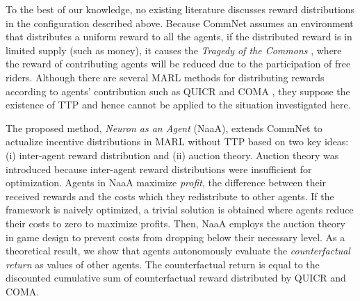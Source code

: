 To the best of our knowledge, no existing literature discusses reward distributions in the configuration described above.
Because CommNet assumes an environment that distributes a uniform reward to all the agents, 
if the distributed reward is in limited supply (such as money), it causes the {\em Tragedy of the Commons} \citep{lloyd1833two}, where the reward of contributing agents will be reduced due to the participation of free riders.
Although there are several MARL methods for distributing rewards according to agents' contribution such as QUICR \citep{agogino2006quicr} and COMA \citep{sukhbaatar2016learning}, they suppose the existence of TTP and hence cannot be applied to the situation investigated here.


The proposed method, {\em Neuron as an Agent} (NaaA), extends CommNet to actualize incentive distributions
in MARL without TTP based on two key ideas: (i) inter-agent reward distribution and (ii) auction theory.
Auction theory was introduced because inter-agent reward distributions were insufficient for optimization.
Agents in NaaA maximize {\em profit}, the difference between their received rewards and the costs which they redistribute to other agents.
If the framework is naively optimized, a trivial solution is obtained where agents reduce their costs to zero to maximize profits.
Then, NaaA employs the auction theory in game design to prevent costs from dropping below their necessary level.
As a theoretical result, we show that agents autonomously evaluate the {\em counterfactual return} as values of other agents.
The counterfactual return is equal to the discounted cumulative sum of counterfactual reward \citep{agogino2006quicr} distributed by QUICR and COMA.

